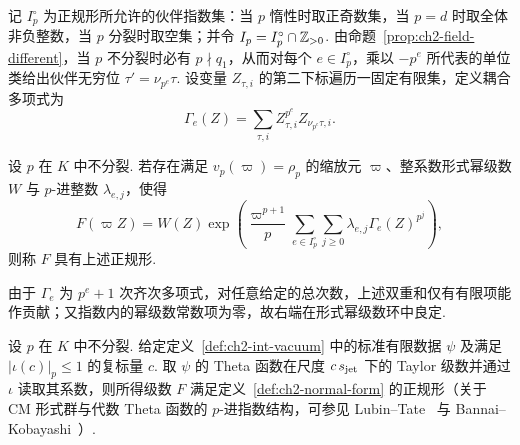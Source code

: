 记 $I_p^\circ$ 为正规形所允许的伙伴指数集：当 $p$ 惰性时取正奇数集，当 $p=d$ 时取全体非负整数，当 $p$ 分裂时取空集；并令 $I_p=I_p^\circ\cap\mathbb{Z}_{>0}$. 由命题~\ref{prop:ch2-field-different}，当 $p$ 不分裂时必有 $p\nmid q_1$，从而对每个 $e\in I_p^\circ$，乘以 $-p^e$ 所代表的单位类给出伙伴无穷位 $\tau'=\nu_{p^e}\tau$. 设变量 $Z_{\tau,i}$ 的第二下标遍历一固定有限集，定义耦合多项式为
\begin{equation}
\label{eq:ch2-coupling}
 \Gamma_e(Z)=\sum_{\tau,i}Z_{\tau,i}^{p^e}Z_{\nu_{p^e}\tau,i}.
\end{equation}

\begin{definition}[正规形]
\label{def:ch2-normal-form}
设 $p$ 在 $K$ 中不分裂. 若存在满足 $v_p(\varpi)=\rho_p$ 的缩放元 $\varpi$、整系数形式幂级数 $W$ 与 $p$-进整数 $\lambda_{e,j}$，使得
\begin{equation}
\label{eq:ch2-normal-form}
 F(\varpi Z)=W(Z)\exp\!\left(
    \frac{\varpi^{p+1}}{p}
    \sum_{e\in I_p^\circ}\sum_{j\ge0}
          \lambda_{e,j}\Gamma_e(Z)^{p^j}
 \right),
\end{equation}
则称 $F$ 具有上述正规形.
\end{definition}
由于 $\Gamma_e$ 为 $p^e+1$ 次齐次多项式，对任意给定的总次数，上述双重和仅有有限项能作贡献；又指数内的幂级数常数项为零，故右端在形式幂级数环中良定.

\begin{theorem}
\label{thm:ch2-normal-form}
设 $p$ 在 $K$ 中不分裂. 给定定义~\ref{def:ch2-int-vacuum} 中的标准有限数据 $\psi$ 及满足 $|\iota(c)|_p\le1$ 的复标量 $c$. 取 $\psi$ 的 Theta 函数在尺度 $c\,s_{\rm jet}$ 下的 Taylor 级数并通过 $\iota$ 读取其系数，则所得级数 $F$ 满足定义~\ref{def:ch2-normal-form} 的正规形（关于 CM 形式群与代数 Theta 函数的 $p$-进指数结构，可参见 Lubin--Tate~\cite{LubinTate1965} 与 Bannai--Kobayashi~\cite{BannaiKobayashi2010}）.
\end{theorem}

